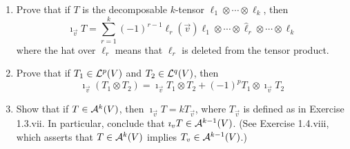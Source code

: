 \documentclass[../psets.tex]{subfiles}
\begin{document}
\begin{enumerate}[label={\textbf{1.7.\roman*.}}]
    \item Prove that if $T$ is the decomposable $k$-tensor $\ell_1\otimes\cdots\otimes\ell_k$, then
    \begin{equation*}
        \imath_\vec{v}T = \sum_{r=1}^k(-1)^{r-1}\ell_r(\vec{v})\ell_1\otimes\cdots\otimes\hat{\ell}_r\otimes\cdots\otimes\ell_k
    \end{equation*}
    where the hat over $\ell_r$ means that $\ell_r$ is deleted from the tensor product.
    \item Prove that if $T_1\in\lin[p]{V}$ and $T_2\in\lin[q]{V}$, then
    \begin{equation*}
        \imath_\vec{v}(T_1\otimes T_2) = \imath_\vec{v}T_1\otimes T_2+(-1)^pT_1\otimes\imath_\vec{v}T_2
    \end{equation*}
    \item Show that if $T\in\alt[k]{V}$, then $\imath_\vec{v}T=kT_\vec{v}$, where $T_\vec{v}$ is defined as in Exercise 1.3.vii. In particular, conclude that $\imath_\vec{v}T\in\alt[k-1]{V}$. (See Exercise 1.4.viii, which asserts that $T\in\alt[k]{V}$ implies $T_\vec{v}\in\alt[k-1]{V}$.)
\end{enumerate}
\end{document}
